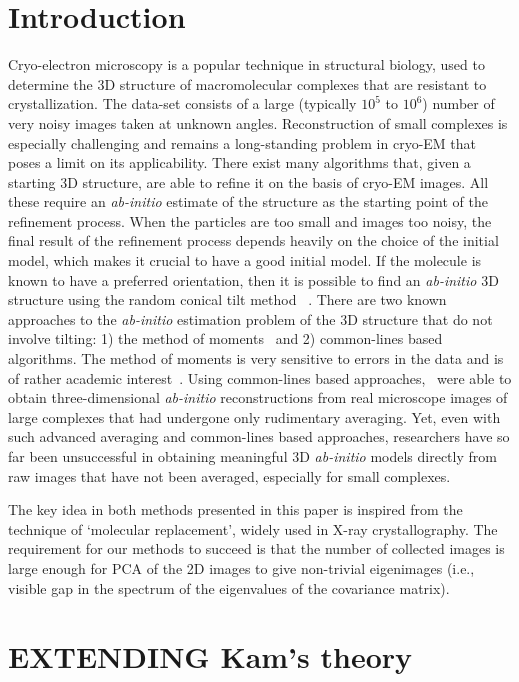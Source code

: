 \documentclass{article}
\begin{document}
\section{Introduction}
\label{sec:intro}
Cryo-electron microscopy is a popular technique in structural biology, used to determine
the 3D structure of macromolecular complexes that are resistant to crystallization.  The
data-set consists of a large (typically $10^5$ to $10^6$) number of very noisy images
taken at unknown angles. Reconstruction of small complexes is especially challenging and
remains a long-standing problem in cryo-EM that poses a limit on its applicability.  There
exist many algorithms that, given a starting 3D structure, are able to refine it on the
basis of cryo-EM images.  All these require an \textit{ab-initio} estimate of the
structure as the starting point of the refinement process. When the particles are too
small and images too noisy, the final result of the refinement process depends heavily on
the choice of the initial model, which makes it crucial to have a good initial model. If
the molecule is known to have a preferred orientation, then it is possible to find an
\textit{ab-initio} 3D structure using the random conical tilt method ~\cite{Radermacher,
Radermacher2}. There are two known approaches to the \textit{ab-initio} estimation problem
of the 3D structure that do not involve tilting: 1) the method of
moments~\cite{Salzman, Goncharov} and 2) common-lines based algorithms. The method of
moments is very sensitive to errors in the data and is of rather academic
interest~\cite[section 2.1, p. 251]{Penczek}.  Using common-lines based
approaches,~\cite{Zhao} were able to obtain three-dimensional \textit{ab-initio}
reconstructions from real microscope images of large complexes that had undergone only
rudimentary averaging.  Yet, even with such advanced averaging and common-lines based
approaches, researchers have so far been unsuccessful in obtaining meaningful 3D
\textit{ab-initio} models directly from raw images that have not been averaged, especially
for small complexes. 

The key idea in both methods presented in this paper is inspired from the technique of
`molecular replacement', widely used in X-ray crystallography. The requirement for our
methods to succeed is that the number of collected images is large enough for PCA of the
2D images to give non-trivial eigenimages (i.e., visible gap in the spectrum of the
eigenvalues of the covariance matrix).

\section{ EXTENDING Kam's theory}
\end{document}
